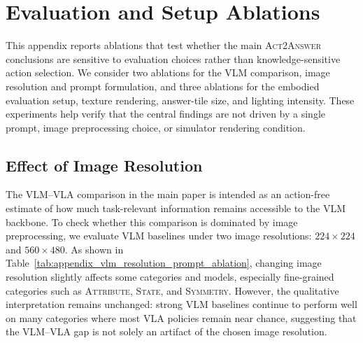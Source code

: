 \documentclass[11pt]{article}
\begin{document}

\clearpage

\appendix

\label{sec:appendix}

\section{Evaluation and Setup Ablations}
\label{sec:appendix_eval_setup_ablations}

This appendix reports ablations that test whether the main \textsc{Act2Answer} conclusions are sensitive to evaluation choices rather than knowledge-sensitive action selection.
We consider two ablations for the VLM comparison, image resolution and prompt formulation, and three ablations for the embodied evaluation setup, texture rendering, answer-tile size, and lighting intensity. These experiments help verify that the central findings are not driven by a single prompt, image preprocessing choice, or simulator rendering condition.

\subsection{Effect of Image Resolution}

The VLM--VLA comparison in the main paper is intended as an action-free estimate of how much task-relevant information remains accessible to the VLM backbone.
To check whether this comparison is dominated by image preprocessing, we evaluate VLM baselines under two image resolutions: $224 \times 224$ and $560 \times 480$.
As shown in Table~\ref{tab:appendix_vlm_resolution_prompt_ablation}, changing image resolution slightly affects some categories and models, especially fine-grained categories such as \textsc{Attribute}, \textsc{State}, and \textsc{Symmetry}.
However, the qualitative interpretation remains unchanged: strong VLM baselines continue to perform well on many categories where most VLA policies remain near chance, suggesting that the VLM--VLA gap is not solely an artifact of the chosen image resolution.
\end{document}
